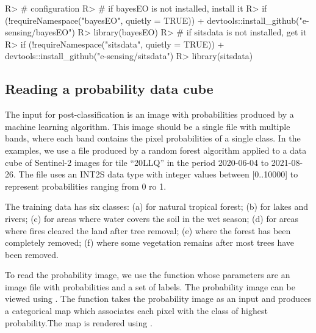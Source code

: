 \documentclass[
  shortnames]{jss}
\begin{document}
\begin{CodeChunk}
\begin{CodeInput}
R> # configuration 
R> # if bayesEO is not installed, install it
R> if (!requireNamespace("bayesEO", quietly = TRUE))
+     devtools::install_github("e-sensing/bayesEO")
R> library(bayesEO)
R> # if sitsdata is not installed, get it
R> if (!requireNamespace("sitsdata", quietly = TRUE))
+     devtools::install_github("e-sensing/sitsdata")
R> library(sitsdata)
\end{CodeInput}
\end{CodeChunk}

\hypertarget{reading-a-probability-data-cube}{%
\subsection{Reading a probability data cube}\label{reading-a-probability-data-cube}}

The input for post-classification is an image with probabilities produced by a machine learning algorithm. This image should be a single file with multiple bands, where each band contains the pixel probabilities of a single class. In the examples, we use a file produced by a random forest algorithm applied to a data cube of Sentinel-2 images for tile ``20LLQ'' in the period 2020-06-04 to 2021-08-26. The file uses an INT2S data type with integer values between {[}0..10000{]} to represent probabilities ranging from 0 ro 1.

The training data has six classes: (a)  for natural tropical forest; (b)  for lakes and rivers; (c)  for areas where water covers the soil in the wet season; (d)  for areas where fires cleared the land after tree removal; (e)  where the forest has been completely removed; (f)  where some vegetation remains after most trees have been removed.

To read the probability image, we use the function  whose parameters are an image file with probabilities and a set of labels. The probability image can be viewed using . The function  takes the probability image as an input and produces a categorical map which associates each pixel with the class of highest probability.The map is rendered using .
\end{document}
